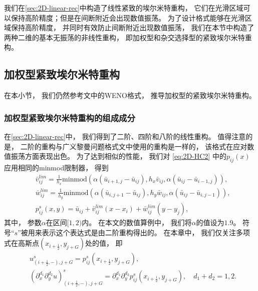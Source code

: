 我们在\cref{sec:2D-linear-rec}中构造了线性紧致的埃尔米特重构，
它们在光滑区域可以保持高阶精度；但是在间断附近会出现数值振荡。
为了设计格式能够在光滑区域保持高阶精度，
并同时有效防止间断附近出现数值振荡，
我们在本节中构造了两种二维的基本无振荡的非线性重构，
即加权型和杂交选择型的紧致埃尔米特重构。

\subsection{加权型紧致埃尔米特重构}
\label{sec:2D-WHC}

在本小节，
我们仍然参考文\cite{WENO-1996,CWENO-origin,CWENO13579,WENOAO,WENO_Z}中的WENO格式，
推导加权型的紧致埃尔米特重构。

\subsubsection{加权型紧致埃尔米特重构的组成成分}

在\cref{sec:2D-linear-rec}中，
我们得到了二阶、四阶和八阶的线性重构。
值得注意的是，
二阶的重构与广义黎曼问题格式文\cite{Book-Matania}中使用的重构是一样的，
该格式在应对数值振荡方面表现出色。
为了达到相似的性能，
我们对 \cref{eq:2D-HC2} 中的$p_{ij}(x)$应用相同的minmod限制器，
得到
\begin{align}
  \label{eq:2D-minmod-limiter}
   & \bar v^{lim}_{ij} =\frac{1}{h_x}\mbox{minmod}(\alpha(\bar u_{i+1,j}-\bar u_{ij}), h_x\bar v_{ij}, \alpha(\bar u_{ij}-\bar u_{i-1,j})), \\
   & \bar w^{lim}_{ij} =\frac{1}{h_y}\mbox{minmod}(\alpha(\bar u_{i,j+1}-\bar u_{ij}), h_y\bar w_{ij}, \alpha(\bar u_{ij}-\bar u_{i,j-1})), \\
   & p^{{s}}_{ij}(x,y) = \bar u_{ij}+ \bar v^{lim}_{ij}(x-x_i) + \bar w^{lim}_{ij}(y-y_j),
\end{align}
其中，
参数$\alpha$在区间$[1,2)$内。
在本文的数值算例中，
我们将$\alpha$的值设为$1.9$。
符号“${{s}}$”被用来表示这个表达式是由二阶重构得出的。
在本章中，
我们仅关注多项式在高斯点$(x_{i+\frac{1}{2}},y_{j+G})$处的值，
即
\begin{align}
   & u_{(i+\frac{1}{2},-), j+G}^{{s}}= p^{{s}}_{ij}(x_{i+\frac{1}{2}}, y_{j+G}),                                                                                                                  \\
   & \left({\partial_{x}^{d_1}}{\partial_{y}^{d_2}}u\right)_{(i+\frac{1}{2},-), j+G}^{{s}}= {\partial_{x}^{d_1}}{\partial_{y}^{d_2}}p_{ij}^{{s}}(x_{i+\frac{1}{2}}, y_{j+G}), \quad d_1+d_2=1,2.
\end{align}

